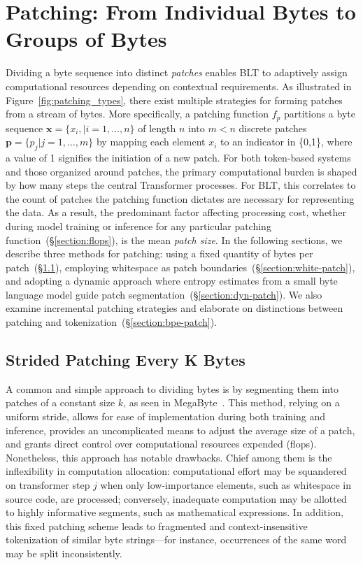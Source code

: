 \section{Patching: From Individual Bytes to Groups of Bytes}
\label{section:patching}

Dividing a byte sequence into distinct \textit{patches} enables {\textsc BLT} to adaptively assign computational resources depending on contextual requirements. As illustrated in Figure~\ref{fig:patching_types}, there exist multiple strategies for forming patches from a stream of bytes. More specifically, a patching function $f_p$ partitions a byte sequence $\pmb{x} = \{x_i, |i=1, \ldots, n\}$ of length $n$ into $m < n$ discrete patches $\pmb{p} = \{p_j | j = 1, \ldots, m\}$ by mapping each element $x_i$ to an indicator in \{0,1\}, where a value of 1 signifies the initiation of a new patch. For both token-based systems and those organized around patches, the primary computational burden is shaped by how many steps the central Transformer processes. For {\textsc BLT}, this correlates to the count of patches the patching function dictates are necessary for representing the data. As a result, the predominant factor affecting processing cost, whether during model training or inference for any particular patching function~(\S\ref{section:flops}), is the mean \textit{patch size}. In the following sections, we describe three methods for patching: using a fixed quantity of bytes per patch~(\S\ref{section:static-patch}), employing whitespace as patch boundaries~(\S\ref{section:white-patch}), and adopting a dynamic approach where entropy estimates from a small byte language model guide patch segmentation~(\S\ref{section:dyn-patch}). We also examine incremental patching strategies and elaborate on distinctions between patching and tokenization~(\S\ref{section:bpe-patch}).

\subsection{Strided Patching Every K Bytes}
\label{section:static-patch}

A common and simple approach to dividing bytes is by segmenting them into patches of a constant size $k$, as seen in MegaByte~\citep{yu2023megabyte}. This method, relying on a uniform stride, allows for ease of implementation during both training and inference, provides an uncomplicated means to adjust the average size of a patch, and grants direct control over computational resources expended (flops). Nonetheless, this approach has notable drawbacks. Chief among them is the inflexibility in computation allocation: computational effort may be squandered on transformer step $j$ when only low-importance elements, such as whitespace in source code, are processed; conversely, inadequate computation may be allotted to highly informative segments, such as mathematical expressions. In addition, this fixed patching scheme leads to fragmented and context-insensitive tokenization of similar byte strings—for instance, occurrences of the same word may be split inconsistently.

